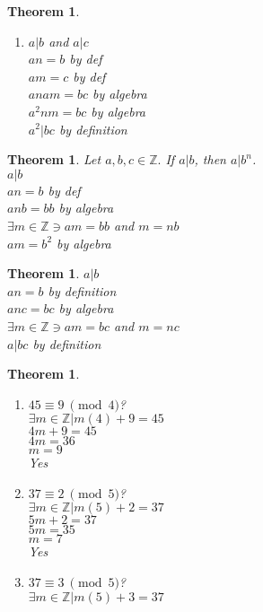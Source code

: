 \documentclass{article}
\newtheorem{theorem}[section]{Theorem}
\begin{document}
\begin{theorem}
\begin{enumerate}
			$a|bc$ by definition\\
		\item
			$a|b$ and $a|c$\\
			$an=b$ by def\\
			$am=c$ by def\\
			$anam=bc$ by algebra\\
			$a^2nm=bc$ by algebra\\
			$a^2|bc$ by definition
	\end{enumerate}
\end{theorem}\begin{theorem}%
	Let $a,b,c \in \mathbb{Z}.$ If $a|b$, then $a|b^n$.\\
	$a|b$\\
	$an=b$ by def\\
	$anb=bb$ by algebra\\
	$\exists m \in \mathbb{Z} \ni am=bb$ and $m=nb$\\
	$am=b^2$ by algebra\\
\end{theorem}\begin{theorem}%
	$a|b$\\
	$an=b$ by definition\\
	$anc=bc$ by algebra\\
	$\exists m \in \mathbb{Z} \ni am=bc$ and $m=nc$\\
	$a|bc$ by definition\\
\end{theorem}\begin{theorem}%
	\begin{enumerate}
		\item[1]
			$45 \equiv 9~\pmod{4}$?\\
			$\exists m \in \mathbb{Z}|m(4) + 9 = 45$\\
			$4m + 9 = 45$\\
			$4m = 36$\\
			$m = 9$\\
			Yes
		\item[2]
			$37 \equiv 2~\pmod{5}$?\\
			$\exists m \in \mathbb{Z}|m(5) + 2 = 37$\\
			$5m + 2 = 37$\\
			$5m = 35$\\
			$m = 7$\\
			Yes
		\item[3]
			$37 \equiv 3~\pmod{5}$?\\
			$\exists m \in \mathbb{Z}|m(5) + 3 = 37$\\

\end{enumerate}
\end{theorem}
\end{document}
